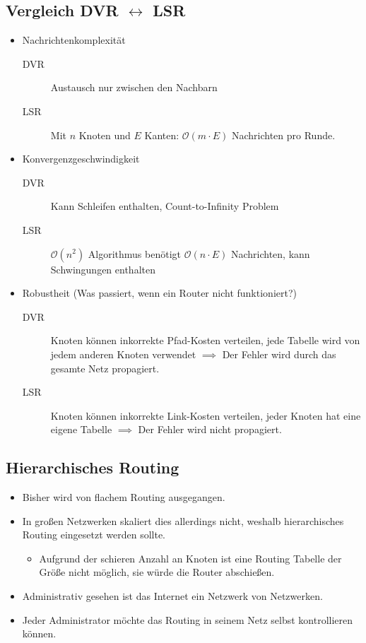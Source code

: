 		\subsection{Vergleich DVR \(\leftrightarrow\) LSR}
			\begin{itemize}
				\item Nachrichtenkomplexität
					\begin{description}
						\item[DVR] Austausch nur zwischen den Nachbarn
						\item[LSR] Mit \(n\) Knoten und \(E\) Kanten: \(\mathcal{O}(m \cdot E)\) Nachrichten pro Runde.
					\end{description}
				\item Konvergenzgeschwindigkeit
					\begin{description}
						\item[DVR] Kann Schleifen enthalten, Count-to-Infinity Problem
						\item[LSR] \(\mathcal{O}(n^2)\) Algorithmus benötigt \(\mathcal{O}(n \cdot E)\) Nachrichten, kann Schwingungen enthalten
					\end{description}
				\item Robustheit (Was passiert, wenn ein Router nicht funktioniert?)
					\begin{description}
						\item[DVR] Knoten können inkorrekte Pfad-Kosten verteilen, jede Tabelle wird von jedem anderen Knoten verwendet \(\implies\) Der Fehler wird durch das gesamte Netz propagiert.
						\item[LSR] Knoten können inkorrekte Link-Kosten verteilen, jeder Knoten hat eine eigene Tabelle \(\implies\) Der Fehler wird nicht propagiert.
					\end{description}
			\end{itemize}

		\subsection{Hierarchisches Routing}
			\begin{itemize}
				\item Bisher wird von flachem Routing ausgegangen.
				\item In großen Netzwerken skaliert dies allerdings nicht, weshalb hierarchisches Routing eingesetzt werden sollte.
					\begin{itemize}
						\item Aufgrund der schieren Anzahl an Knoten ist eine Routing Tabelle der Größe nicht möglich, sie würde die Router abschießen.
					\end{itemize}
				\item Administrativ gesehen ist das Internet ein Netzwerk von Netzwerken.
				\item Jeder Administrator möchte das Routing in seinem Netz selbst kontrollieren können.
			\end{itemize}


